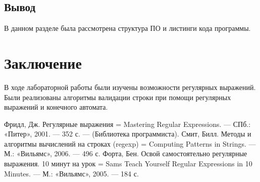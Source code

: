 \documentclass[12pt]{report}
\begin{document}
\section{Вывод}
В данном разделе была рассмотрена структура ПО и листинги кода программы.


\chapter*{Заключение}
В ходе лабораторной работы были изучены возможности регулярных выражений. Были реализованы алгоритмы валидации строки при помощи регулярных выражений и конечного автомата.


\begin{thebibliography}{3}
	Фридл, Дж. Регулярные выражения = Mastering Regular Expressions. — СПб.: «Питер», 2001. — 352 с. — (Библиотека программиста). 	
	Смит, Билл. Методы и алгоритмы вычислений на строках (regexp) = Computing Patterns in Strings. — М.: «Вильямс», 2006. — 496 с.
	Форта, Бен. Освой самостоятельно регулярные выражения. 10 минут на урок = Sams Teach Yourself Regular Expressions in 10 Minutes. — М.: «Вильямс», 2005. — 184 с.
\end{thebibliography}
\end{document}
